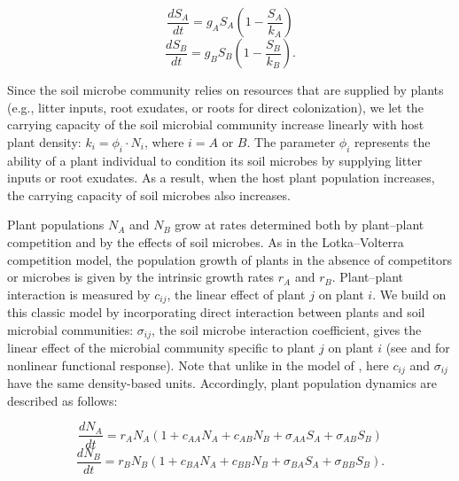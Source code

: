 \begin{equation}
\frac{dS_{A}}{dt} = g_{A}S_{A}\left ( 1-\frac{S_{A}}{k_{A}}\right )
\tag{4.1}\label{eq:SoilA}
\end{equation}
\begin{equation}
\frac{dS_{B}}{dt} = g_{B}S_{B}\left ( 1-\frac{S_{B}}{k_{B}}\right ) .
\tag{4.2}\label{eq:SoilB}
\end{equation}

\noindent Since the soil microbe community relies on resources that are supplied by plants (e.g., litter inputs, root exudates, or roots for direct colonization), we let the carrying capacity of the soil microbial community increase linearly with host plant density: $k_{i} = \phi_{i} \cdot N_{i}$, where $i = A$ or $B$. The parameter $\phi_{i}$ represents the ability of a plant individual to condition its soil microbes by supplying litter inputs or root exudates. As a result, when the host plant population increases, the carrying capacity of soil microbes also increases.
\par


Plant populations $N_{A}$ and $N_{B}$ grow at rates determined both by plant--plant competition and by the effects of soil microbes. As in the Lotka--Volterra competition model, the population growth of plants in the absence of competitors or microbes is given by the intrinsic growth rates $r_{A}$ and $r_{B}$. Plant--plant interaction is measured by $c_{ij}$, the linear effect of plant $j$ on plant $i$. We build on this classic model by incorporating direct interaction between plants and soil microbial communities: $\sigma_{ij}$, the soil microbe interaction coefficient, gives the linear effect of the microbial community specific to plant $j$ on plant $i$ (see \citealp{Eppinga2006} and \citealp{Aguilera2011} for nonlinear functional response). Note that unlike in the model of \citet{Bever2003}, here $c_{ij}$ and $\sigma_{ij}$ have the same density-based units. Accordingly, plant population dynamics are described as follows:

\begin{equation}
\frac{dN_{A}}{dt} = r_{A}N_{A} \left( 1 + c_{AA}N_{A}+c_{AB}N_{B} + \sigma_{AA}S_{A}+\sigma_{AB}S_{B} \right)
\tag{4.3}\label{eq:Na}
\end{equation}
\begin{equation}
\frac{dN_{B}}{dt} = r_{B}N_{B} \left( 1 + c_{BA}N_{A}+c_{BB}N_{B} + \sigma_{BA}S_{A}+\sigma_{BB}S_{B} \right) .
\tag{4.4}\label{eq:Nb}
\end{equation}

